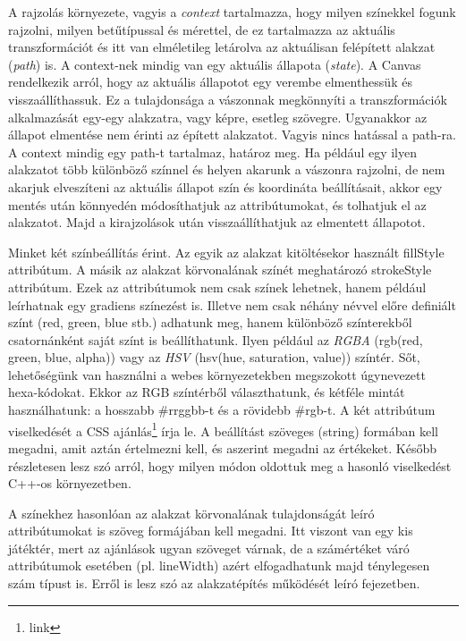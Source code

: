 \documentclass[12pt]{report}
\theoremstyle{definition}
\newcommand{\inenglish}[1]{\textsl{#1}}
\newcommand{\func}[1]{{\textsf{\footnotesize{#1}}}}
\begin{document}
A rajzolás környezete, vagyis a \emph{context} tartalmazza, hogy milyen
színekkel fogunk rajzolni, milyen betűtípussal és mérettel, de ez tartalmazza
az aktuális transzformációt és itt van elméletileg letárolva az aktuálisan
felépített alakzat (\inenglish{path}) is. A context-nek mindig van egy aktuális
állapota (\inenglish{state}). A Canvas rendelkezik arról, hogy az aktuális
állapotot egy verembe elmenthessük és visszaállíthassuk. Ez a tulajdonsága a
vászonnak megkönnyíti a transzformációk alkalmazását egy-egy alakzatra, vagy
képre, esetleg szövegre. Ugyanakkor az állapot elmentése nem érinti az épített
alakzatot. Vagyis nincs hatással a path-ra. A context mindig egy path-t
tartalmaz, határoz meg. Ha például egy ilyen alakzatot több különböző színnel
és helyen akarunk a vászonra rajzolni, de nem akarjuk elveszíteni az aktuális
állapot szín és koordináta beállításait, akkor egy mentés után könnyedén
módosíthatjuk az attribútumokat, és tolhatjuk el az alakzatot. Majd a
kirajzolások után visszaállíthatjuk az elmentett állapotot.

Minket két színbeállítás érint. Az egyik az alakzat kitöltésekor használt
\func{fillStyle} attribútum. A másik az alakzat körvonalának színét meghatározó
\func{strokeStyle} attribútum. Ezek az attribútumok nem csak színek lehetnek,
hanem például leírhatnak egy gradiens színezést is. Illetve nem csak néhány
névvel előre definiált színt (\func{red}, \func{green}, \func{blue} stb.)
adhatunk meg, hanem különböző színterekből csatornánként saját színt is
beállíthatunk. Ilyen például az \emph{RGBA} (\func{rgb(red, green, blue,
alpha)}) vagy az \emph{HSV} (\func{hsv(hue, saturation, value)}) színtér. Sőt,
lehetőségünk van használni a webes környezetekben megszokott úgynevezett
hexa-kódokat. Ekkor az RGB színtérből választhatunk, és kétféle mintát
használhatunk: a hosszabb \func{\#rrggbb}-t és a rövidebb \func{\#rgb}-t. A két
attribútum viselkedését a CSS ajánlás\footnote{link} írja le. A beállítást
szöveges (\func{string}) formában kell megadni, amit aztán értelmezni kell, és
aszerint megadni az értékeket. Később részletesen lesz szó arról, hogy
milyen módon oldottuk meg a hasonló viselkedést C++-os környezetben.

A színekhez hasonlóan az alakzat körvonalának tulajdonságát leíró
attribútumokat is szöveg formájában kell megadni. Itt viszont van egy kis
játéktér, mert az ajánlások ugyan szöveget várnak, de a számértéket
váró attribútumok esetében (pl. \func{lineWidth}) azért elfogadhatunk majd
ténylegesen szám típust is. Erről is lesz szó az alakzatépítés
működését leíró fejezetben.
\end{document}
